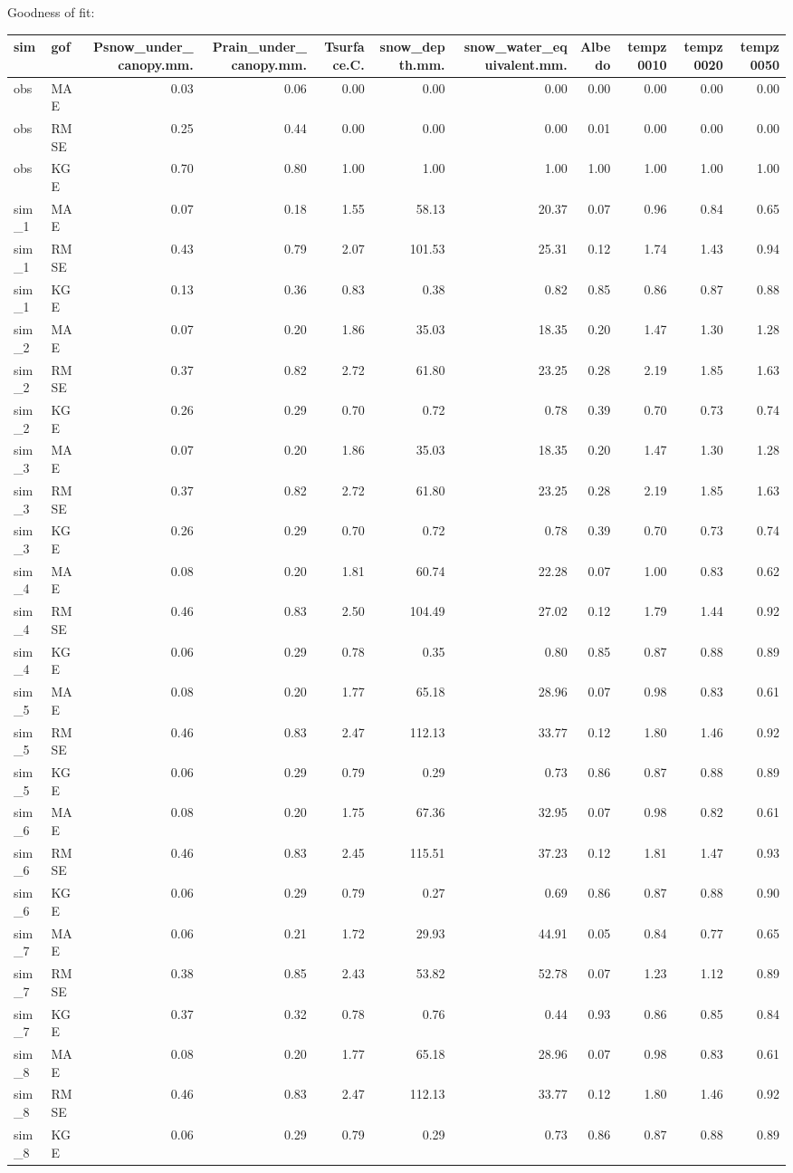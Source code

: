 \documentclass[
]{article}
\begin{document}
Goodness of fit:

\begin{longtable}[]{@{}llrrrrrrrrr@{}}
\toprule
sim & gof & Psnow\_under\_canopy.mm. & Prain\_under\_canopy.mm. &
Tsurface.C. & snow\_depth.mm. & snow\_water\_equivalent.mm. & Albedo &
tempz0010 & tempz0020 & tempz0050\tabularnewline
\midrule
\endhead
obs & MAE & 0.03 & 0.06 & 0.00 & 0.00 & 0.00 & 0.00 & 0.00 & 0.00 &
0.00\tabularnewline
obs & RMSE & 0.25 & 0.44 & 0.00 & 0.00 & 0.00 & 0.01 & 0.00 & 0.00 &
0.00\tabularnewline
obs & KGE & 0.70 & 0.80 & 1.00 & 1.00 & 1.00 & 1.00 & 1.00 & 1.00 &
1.00\tabularnewline
sim\_1 & MAE & 0.07 & 0.18 & 1.55 & 58.13 & 20.37 & 0.07 & 0.96 & 0.84 &
0.65\tabularnewline
sim\_1 & RMSE & 0.43 & 0.79 & 2.07 & 101.53 & 25.31 & 0.12 & 1.74 & 1.43
& 0.94\tabularnewline
sim\_1 & KGE & 0.13 & 0.36 & 0.83 & 0.38 & 0.82 & 0.85 & 0.86 & 0.87 &
0.88\tabularnewline
sim\_2 & MAE & 0.07 & 0.20 & 1.86 & 35.03 & 18.35 & 0.20 & 1.47 & 1.30 &
1.28\tabularnewline
sim\_2 & RMSE & 0.37 & 0.82 & 2.72 & 61.80 & 23.25 & 0.28 & 2.19 & 1.85
& 1.63\tabularnewline
sim\_2 & KGE & 0.26 & 0.29 & 0.70 & 0.72 & 0.78 & 0.39 & 0.70 & 0.73 &
0.74\tabularnewline
sim\_3 & MAE & 0.07 & 0.20 & 1.86 & 35.03 & 18.35 & 0.20 & 1.47 & 1.30 &
1.28\tabularnewline
sim\_3 & RMSE & 0.37 & 0.82 & 2.72 & 61.80 & 23.25 & 0.28 & 2.19 & 1.85
& 1.63\tabularnewline
sim\_3 & KGE & 0.26 & 0.29 & 0.70 & 0.72 & 0.78 & 0.39 & 0.70 & 0.73 &
0.74\tabularnewline
sim\_4 & MAE & 0.08 & 0.20 & 1.81 & 60.74 & 22.28 & 0.07 & 1.00 & 0.83 &
0.62\tabularnewline
sim\_4 & RMSE & 0.46 & 0.83 & 2.50 & 104.49 & 27.02 & 0.12 & 1.79 & 1.44
& 0.92\tabularnewline
sim\_4 & KGE & 0.06 & 0.29 & 0.78 & 0.35 & 0.80 & 0.85 & 0.87 & 0.88 &
0.89\tabularnewline
sim\_5 & MAE & 0.08 & 0.20 & 1.77 & 65.18 & 28.96 & 0.07 & 0.98 & 0.83 &
0.61\tabularnewline
sim\_5 & RMSE & 0.46 & 0.83 & 2.47 & 112.13 & 33.77 & 0.12 & 1.80 & 1.46
& 0.92\tabularnewline
sim\_5 & KGE & 0.06 & 0.29 & 0.79 & 0.29 & 0.73 & 0.86 & 0.87 & 0.88 &
0.89\tabularnewline
sim\_6 & MAE & 0.08 & 0.20 & 1.75 & 67.36 & 32.95 & 0.07 & 0.98 & 0.82 &
0.61\tabularnewline
sim\_6 & RMSE & 0.46 & 0.83 & 2.45 & 115.51 & 37.23 & 0.12 & 1.81 & 1.47
& 0.93\tabularnewline
sim\_6 & KGE & 0.06 & 0.29 & 0.79 & 0.27 & 0.69 & 0.86 & 0.87 & 0.88 &
0.90\tabularnewline
sim\_7 & MAE & 0.06 & 0.21 & 1.72 & 29.93 & 44.91 & 0.05 & 0.84 & 0.77 &
0.65\tabularnewline
sim\_7 & RMSE & 0.38 & 0.85 & 2.43 & 53.82 & 52.78 & 0.07 & 1.23 & 1.12
& 0.89\tabularnewline
sim\_7 & KGE & 0.37 & 0.32 & 0.78 & 0.76 & 0.44 & 0.93 & 0.86 & 0.85 &
0.84\tabularnewline
sim\_8 & MAE & 0.08 & 0.20 & 1.77 & 65.18 & 28.96 & 0.07 & 0.98 & 0.83 &
0.61\tabularnewline
sim\_8 & RMSE & 0.46 & 0.83 & 2.47 & 112.13 & 33.77 & 0.12 & 1.80 & 1.46
& 0.92\tabularnewline
sim\_8 & KGE & 0.06 & 0.29 & 0.79 & 0.29 & 0.73 & 0.86 & 0.87 & 0.88 &
0.89\tabularnewline
\bottomrule
\end{longtable}
\end{document}
